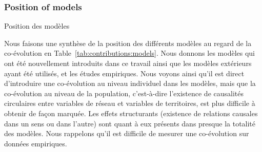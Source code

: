 \subsubsection{Position of models}{Position des modèles}

Nous faisons une synthèse de la position des différents modèles au regard de la co-évolution en Table~\ref{tab:contributions:models}. Nous donnons les modèles qui ont été nouvellement introduits dans ce travail ainsi que les modèles extérieurs ayant été utilisés, et les études empiriques. Nous voyons ainsi qu'il est direct d'introduire une co-évolution au niveau individuel dans les modèles, mais que la co-évolution au niveau de la population, c'est-à-dire l'existence de causalités circulaires entre variables de réseau et variables de territoires, est plus difficile à obtenir de façon marquée. Les effets structurants (existence de relations causales dans un sens ou dans l'autre) sont quant à eux présents dans presque la totalité des modèles. Nous rappelons qu'il est difficile de mesurer une co-évolution sur données empiriques.



